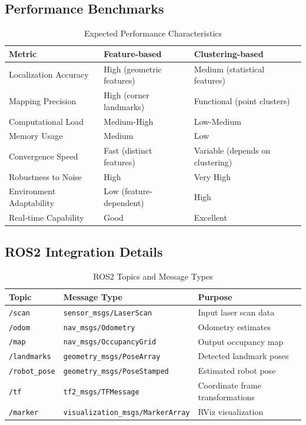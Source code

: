 \documentclass[12pt,a4paper]{article}
\begin{document}
\subsection*{Performance Benchmarks}

\begin{table}[H]
\centering
\caption{Expected Performance Characteristics}
\begin{tabular}{@{}lll@{}}
\toprule
\textbf{Metric} & \textbf{Feature-based} & \textbf{Clustering-based} \\
\midrule
Localization Accuracy & High (geometric features) & Medium (statistical features) \\
Mapping Precision & High (corner landmarks) & Functional (point clusters) \\
Computational Load & Medium-High & Low-Medium \\
Memory Usage & Medium & Low \\
Convergence Speed & Fast (distinct features) & Variable (depends on clustering) \\
Robustness to Noise & High & Very High \\
Environment Adaptability & Low (feature-dependent) & High \\
Real-time Capability & Good & Excellent \\
\bottomrule
\end{tabular}
\end{table}

\subsection*{ROS2 Integration Details}

\begin{table}[H]
\centering
\caption{ROS2 Topics and Message Types}
\begin{tabular}{@{}lll@{}}
\toprule
\textbf{Topic} & \textbf{Message Type} & \textbf{Purpose} \\
\midrule
\texttt{/scan} & \texttt{sensor\_msgs/LaserScan} & Input laser scan data \\
\texttt{/odom} & \texttt{nav\_msgs/Odometry} & Odometry estimates \\
\texttt{/map} & \texttt{nav\_msgs/OccupancyGrid} & Output occupancy map \\
\texttt{/landmarks} & \texttt{geometry\_msgs/PoseArray} & Detected landmark poses \\
\texttt{/robot\_pose} & \texttt{geometry\_msgs/PoseStamped} & Estimated robot pose \\
\texttt{/tf} & \texttt{tf2\_msgs/TFMessage} & Coordinate frame transformations \\
\texttt{/marker} & \texttt{visualization\_msgs/MarkerArray} & RViz visualization \\
\bottomrule
\end{tabular}
\end{table}
\end{document}
